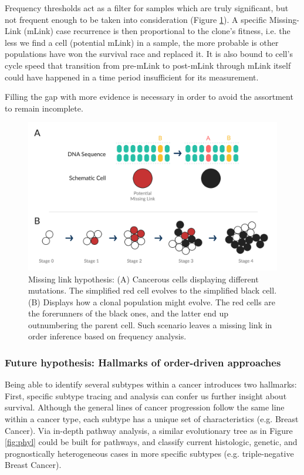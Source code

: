 Frequency thresholds act as a filter for samples which are truly significant, but not frequent enough to be taken into consideration (Figure \ref{fig:mlink}). A specific Missing-Link (mLink) case recurrence is then proportional to the clone's fitness, i.e. the less we find a cell (potential mLink) in a sample, the more probable is other populations have won the survival race and replaced it. It is also bound to cell's cycle speed that transition from pre-mLink to post-mLink through mLink itself could have happened in a time period insufficient for its measurement.

Filling the gap with more evidence is necessary in order to avoid the assortment to remain incomplete.

\begin{figure}[!ht]
    \centering
    \includegraphics[width=\linewidth]{images/Mlink.png}
    \caption{Missing link hypothesis: (A) Cancerous cells displaying different mutations. The simplified red cell evolves to the simplified black cell. (B) Displays how a clonal population might evolve. The red cells are the forerunners of the black ones, and the latter end up outnumbering the parent cell. Such scenario leaves a missing link in order inference based on frequency analysis.}
    \label{fig:mlink}
\end{figure}


\subsubsection{Future hypothesis: Hallmarks of order-driven approaches}
Being able to identify several subtypes within a cancer introduces two hallmarks: First, specific subtype tracing and analysis can confer us further insight about survival. Although the general lines of cancer progression follow the same line within a cancer type, each subtype has a unique set of characteristics (e.g. Breast Cancer). Via in-depth pathway analysis, a similar evolutionary tree as in Figure \ref{fig:phyl} could be built for pathways, and classify current histologic, genetic, and prognostically heterogeneous cases in more specific subtypes (e.g. triple-negative Breast Cancer).

